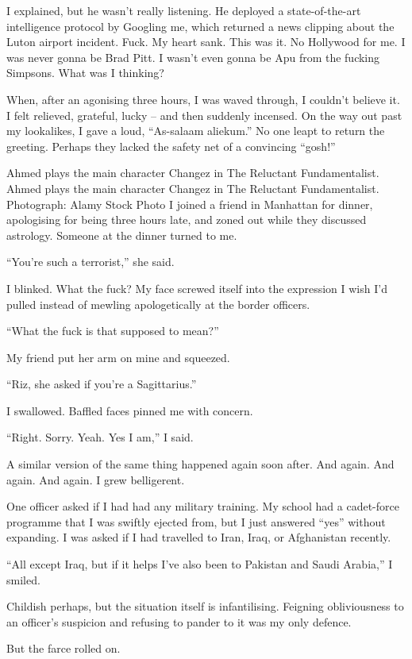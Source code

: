 \documentclass[10pt,a4paper]{article}
\begin{document}
I explained, but he wasn’t really listening. He deployed a state-of-the-art intelligence protocol by Googling me, which returned a news clipping about the Luton airport incident. Fuck. My heart sank. This was it. No Hollywood for me. I was never gonna be Brad Pitt. I wasn’t even gonna be Apu from the fucking Simpsons. What was I thinking?

When, after an agonising three hours, I was waved through, I couldn’t believe it. I felt relieved, grateful, lucky – and then suddenly incensed. On the way out past my lookalikes, I gave a loud, “As-salaam aliekum.” No one leapt to return the greeting. Perhaps they lacked the safety net of a convincing “gosh!”

Ahmed plays the main character Changez in The Reluctant Fundamentalist.
Ahmed plays the main character Changez in The Reluctant Fundamentalist. Photograph: Alamy Stock Photo
I joined a friend in Manhattan for dinner, apologising for being three hours late, and zoned out while they discussed astrology. Someone at the dinner turned to me.

“You’re such a terrorist,” she said.

I blinked. What the fuck? My face screwed itself into the expression I wish I’d pulled instead of mewling apologetically at the border officers.

“What the fuck is that supposed to mean?”

My friend put her arm on mine and squeezed.

“Riz, she asked if you’re a Sagittarius.”

I swallowed. Baffled faces pinned me with concern.

“Right. Sorry. Yeah. Yes I am,” I said.

A similar version of the same thing happened again soon after. And again. And again. And again. I grew belligerent.

One officer asked if I had had any military training. My school had a cadet-force programme that I was swiftly ejected from, but I just answered “yes” without expanding. I was asked if I had travelled to Iran, Iraq, or Afghanistan recently.

“All except Iraq, but if it helps I’ve also been to Pakistan and Saudi Arabia,” I smiled.

Childish perhaps, but the situation itself is infantilising. Feigning obliviousness to an officer’s suspicion and refusing to pander to it was my only defence.

But the farce rolled on.
\end{document}
